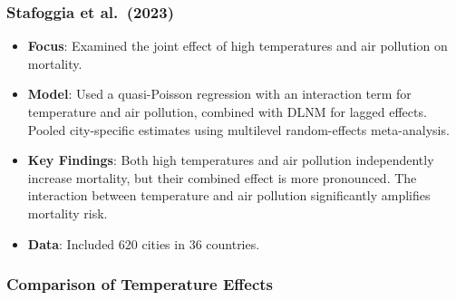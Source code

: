 \documentclass[
]{krantz}
\providecommand{\tightlist}{%
  \setlength{\itemsep}{0pt}\setlength{\parskip}{0pt}}
\begin{document}
\subsubsection{\texorpdfstring{Stafoggia et al.~(2023) \citep{stafoggia2023}}{Stafoggia et al.~(2023) {[}@stafoggia2023{]}}}\label{stafoggia-et-al.-2023-stafoggia2023}

\begin{itemize}
\tightlist
\item
  \textbf{Focus}: Examined the joint effect of high temperatures and air pollution on mortality.
\item
  \textbf{Model}: Used a quasi-Poisson regression with an interaction term for temperature and air pollution, combined with DLNM for lagged effects. Pooled city-specific estimates using multilevel random-effects meta-analysis.
\item
  \textbf{Key Findings}: Both high temperatures and air pollution independently increase mortality, but their combined effect is more pronounced. The interaction between temperature and air pollution significantly amplifies mortality risk.
\item
  \textbf{Data}: Included 620 cities in 36 countries.
\end{itemize}

\subsubsection{Comparison of Temperature Effects}\label{comparison-of-temperature-effects}
\end{document}
